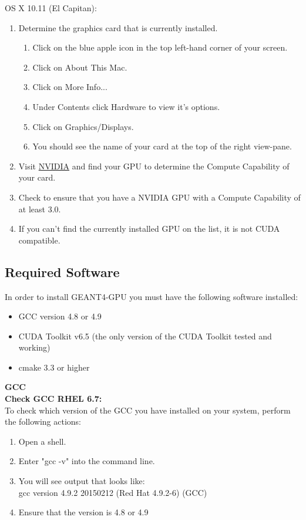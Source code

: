 \documentclass[12pt]{article}
\begin{document}
OS X 10.11 (El Capitan):
\begin{enumerate}
\item Determine the graphics card that is currently installed.
\begin{enumerate}
\item Click on the blue apple icon in the top left-hand corner of your screen.
\item Click on About This Mac.
\item Click on More Info...
\item Under Contents click Hardware to view it's options.
\item Click on Graphics/Displays.
\item You should see the name of your card at the top of the right view-pane.
\end{enumerate}
\item Visit \href{https://developer.nvidia.com/cuda-gpus}{NVIDIA} and find your GPU to determine the Compute Capability of your card.
\item Check to ensure that you have a NVIDIA GPU with a  Compute Capability of at least 3.0.
\item If you can't find the currently installed GPU on the list, it is not CUDA compatible.
\end{enumerate}

\subsection{Required Software} %
In order to install GEANT4-GPU you must have the following software installed:
\begin{itemize}
\item GCC version 4.8 or 4.9
\item CUDA Toolkit v6.5 (the only version of the CUDA Toolkit tested and working)
\item cmake 3.3 or higher
\end{itemize}
\textbf{GCC}\\
\textbf{Check GCC RHEL 6.7:}\\
To check which version of the GCC you have installed on your system, perform the following actions:
\begin{enumerate}
\item Open a shell.
\item Enter "gcc -v" into the command line.
\item You will see output that looks like:\\
gcc version 4.9.2 20150212 (Red Hat 4.9.2-6) (GCC)
\item Ensure that the version is 4.8 or 4.9
\end{enumerate}
\end{document}
